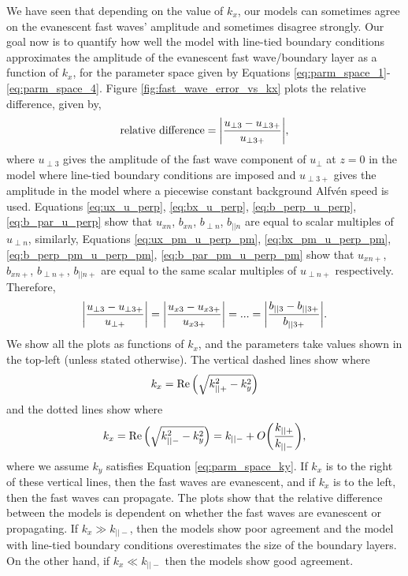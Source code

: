 \documentclass[linenumbers]{aastex63}
\begin{document}
We have seen that depending on the value of $k_x$, our models can sometimes agree on the evanescent fast waves' amplitude and sometimes disagree strongly. Our goal now is to quantify how well the model with line-tied boundary conditions approximates the amplitude of the evanescent fast wave/boundary layer as a function of $k_x$, for the parameter space given by Equations \eqref{eq:parm_space_1}-\eqref{eq:parm_space_4}. Figure \ref{fig:fast_wave_error_vs_kx} plots the relative difference, given by,
\begin{equation}
    \label{eq:relative_difference}
    \text{relative difference} = \abs{\frac{u_{\perp3} - u_{\perp 3+}}{u_{\perp 3+}}},
\end{equation}
where $u_{\perp3}$ gives the amplitude of the fast wave component of $u_\perp$ at $z=0$ in the model where line-tied boundary conditions are imposed and $u_{\perp 3+}$ gives the amplitude in the model where a piecewise constant background Alfv\'en speed is used. Equations \eqref{eq:ux_u_perp}, \eqref{eq:bx_u_perp}, \eqref{eq:b_perp_u_perp}, \eqref{eq:b_par_u_perp} show that $u_{xn}$, $b_{xn}$, $b_{\perp n}$, $b_{|| n}$ are equal to scalar multiples of $u_{\perp n}$, similarly, Equations \eqref{eq:ux_pm_u_perp_pm}, \eqref{eq:bx_pm_u_perp_pm}, \eqref{eq:b_perp_pm_u_perp_pm}, \eqref{eq:b_par_pm_u_perp_pm} show that $u_{xn+}$, $b_{xn+}$, $b_{\perp n+}$, $b_{|| n+}$ are equal to the same scalar multiples of $u_{\perp n+}$ respectively. Therefore,
\[
    \abs{\frac{u_{\perp3} - u_{\perp 3+}}{u_{\perp +}}} = \abs{\frac{u_{x3} - u_{x 3+}}{u_{x 3+}}} = ... = \abs{\frac{b_{||3} - b_{|| 3+}}{b_{|| 3+}}}.
\]
We show all the plots as functions of $k_x$, and the parameters take values shown in the top-left (unless stated otherwise). The vertical dashed lines show where 
\[k_x = \Re\qty(\sqrt{k_{||+}^2-k_y^2})\] 
and the dotted lines show where 
\[k_x = \Re\qty(\sqrt{k_{||-}^2-k_y^2})= k_{||-} + O\qty(\frac{k_{||+}}{k_{||-}}),\]
where we assume $k_y$ satisfies Equation \eqref{eq:parm_space_ky}.
If $k_x$ is to the right of these vertical lines, then the fast waves are evanescent, and if $k_x$ is to the left, then the fast waves can propagate. The plots show that the relative difference between the models is dependent on whether the fast waves are evanescent or propagating. If $k_x \gg k_{||-}$, then the models show poor agreement and the model with line-tied boundary conditions overestimates the size of the boundary layers. On the other hand, if $k_x \ll k_{||-}$
then the models show good agreement.
\end{document}
